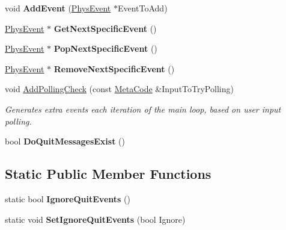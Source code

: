 \begin{DoxyCompactItemize}
\item 
\hypertarget{classPhysEventManager_a7c9bb46b17f6d9245817a402dc6a2f6f}{
void {\bfseries AddEvent} (\hyperlink{classPhysEvent}{PhysEvent} $\ast$EventToAdd)}
\label{d5/dd7/classPhysEventManager_a7c9bb46b17f6d9245817a402dc6a2f6f}

\item 
\hypertarget{classPhysEventManager_a69b417024fd68d0a92c4e72f513f1476}{
\hyperlink{classPhysEvent}{PhysEvent} $\ast$ {\bfseries GetNextSpecificEvent} ()}
\label{d5/dd7/classPhysEventManager_a69b417024fd68d0a92c4e72f513f1476}

\item 
\hypertarget{classPhysEventManager_aa4d9d04e2ec108527865cdde4264932e}{
\hyperlink{classPhysEvent}{PhysEvent} $\ast$ {\bfseries PopNextSpecificEvent} ()}
\label{d5/dd7/classPhysEventManager_aa4d9d04e2ec108527865cdde4264932e}

\item 
\hypertarget{classPhysEventManager_ac5cb3e925f4d2183650e3fd71dbcc4bb}{
\hyperlink{classPhysEvent}{PhysEvent} $\ast$ {\bfseries RemoveNextSpecificEvent} ()}
\label{d5/dd7/classPhysEventManager_ac5cb3e925f4d2183650e3fd71dbcc4bb}

\item 
void \hyperlink{classPhysEventManager_a1e99385441c5377a741561db581ef3ae}{AddPollingCheck} (const \hyperlink{classMetaCode}{MetaCode} \&InputToTryPolling)
\begin{DoxyCompactList}\small\item\em Generates extra events each iteration of the main loop, based on user input polling. \item\end{DoxyCompactList}\item 
\hypertarget{classPhysEventManager_a77b22f706d22914602982cbcaf05bba9}{
bool {\bfseries DoQuitMessagesExist} ()}
\label{d5/dd7/classPhysEventManager_a77b22f706d22914602982cbcaf05bba9}

\end{DoxyCompactItemize}
\subsection*{Static Public Member Functions}
\begin{DoxyCompactItemize}
\item 
\hypertarget{classPhysEventManager_a9783a16342acd71c9a11ade41a2e226b}{
static bool {\bfseries IgnoreQuitEvents} ()}
\label{d5/dd7/classPhysEventManager_a9783a16342acd71c9a11ade41a2e226b}

\item 
\hypertarget{classPhysEventManager_acc902586015a3cd903d14cb20cd51386}{
static void {\bfseries SetIgnoreQuitEvents} (bool Ignore)}
\label{d5/dd7/classPhysEventManager_acc902586015a3cd903d14cb20cd51386}

\end{DoxyCompactItemize}


